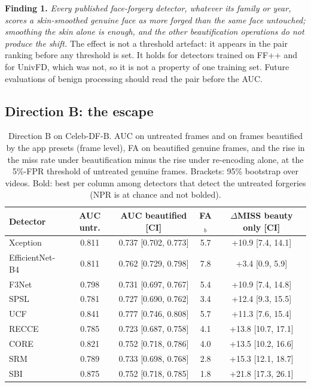 \documentclass[conference]{IEEEtran}
\begin{document}
\textbf{Finding 1.} \emph{Every published face-forgery detector, whatever its family or year, scores a skin-smoothed
genuine face as more forged than the same face untouched; smoothing the skin alone is enough, and the other beautification
operations do not produce the shift.} The effect is not a threshold artefact: it appears in the pair ranking before any
threshold is set. It holds for detectors trained on FF++ and for UnivFD, which was not, so it is not a property of one
training set. Future evaluations of benign processing should read the pair before the AUC.

\subsection{Direction B: the escape}
\label{sec:escape}
\begin{table}[t]
\centering
\caption{Direction B on Celeb-DF-B. AUC on untreated frames and on frames beautified by the app presets (frame level), FA on
beautified genuine frames, and the rise in the miss rate under beautification minus the rise under re-encoding alone, at the
5\%-FPR threshold of untreated genuine frames. Brackets: 95\% bootstrap over videos. Bold: best per column among detectors
that detect the untreated forgeries (NPR is at chance and not bolded).}
\label{tab:dirB}
\scriptsize
\setlength{\tabcolsep}{2.5pt}
\begin{tabular}{@{}l c c c c@{}}
\toprule
Detector & AUC untr. & AUC beautified [CI] & FA$_b$ & $\Delta$MISS beauty only [CI] \\
\midrule
Xception & 0.811 & 0.737 [0.702, 0.773] & 5.7 & +10.9 [7.4, 14.1] \\
EfficientNet-B4 & 0.811 & 0.762 [0.729, 0.798] & 7.8 & +3.4 [0.9, 5.9] \\
F3Net & 0.798 & 0.731 [0.697, 0.767] & 5.4 & +10.9 [7.4, 14.8] \\
SPSL & 0.781 & 0.727 [0.690, 0.762] & 3.4 & +12.4 [9.3, 15.5] \\
UCF & 0.841 & 0.777 [0.746, 0.808] & 5.7 & +11.3 [7.6, 15.4] \\
RECCE & 0.785 & 0.723 [0.687, 0.758] & 4.1 & +13.8 [10.7, 17.1] \\
CORE & 0.821 & 0.752 [0.718, 0.786] & 4.0 & +13.5 [10.2, 16.6] \\
SRM & 0.789 & 0.733 [0.698, 0.768] & 2.8 & +15.3 [12.1, 18.7] \\
SBI & 0.875 & 0.752 [0.718, 0.785] & 1.8 & +21.8 [17.3, 26.1] \\

\end{tabular}
\end{table}
\end{document}
